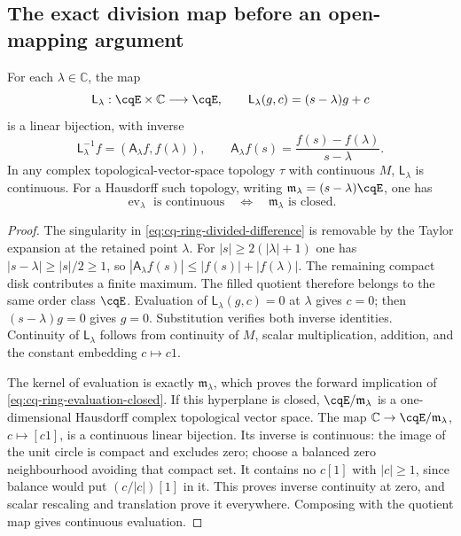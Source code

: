 \subsection{The exact division map before an open-mapping argument}

\begin{cqlemma}
\label{thm:cq-ring-division-map}
For each $\lambda\in\mathbb C$, the map
\begin{equation}
 \mathsf L_\lambda:\cqE\times\mathbb C\longrightarrow\cqE,
 \qquad \mathsf L_\lambda(g,c)=(s-\lambda)g+c
 \label{eq:cq-ring-division-map}
\end{equation}
is a linear bijection, with inverse
\begin{equation}
 \mathsf L_\lambda^{-1}f=(\mathsf A_\lambda f,f(\lambda)),
 \qquad
 \mathsf A_\lambda f(s)=\frac{f(s)-f(\lambda)}{s-\lambda}.
 \label{eq:cq-ring-divided-difference}
\end{equation}
In any complex topological-vector-space topology $\tau$ with
continuous $M$, $\mathsf L_\lambda$ is continuous. For a Hausdorff
such topology, writing
$\mathfrak m_\lambda=(s-\lambda)\cqE$, one has
\begin{equation}
 \operatorname{ev}_\lambda\text{ is continuous}
 \quad\Longleftrightarrow\quad
 \mathfrak m_\lambda\text{ is closed}.
 \label{eq:cq-ring-evaluation-closed}
\end{equation}
\end{cqlemma}
\begin{proof}
The singularity in \eqref{eq:cq-ring-divided-difference} is
removable by the Taylor expansion at the retained point $\lambda$.
For $|s|\geq2(|\lambda|+1)$ one has $|s-\lambda|\geq|s|/2\geq1$,
so
$|\mathsf A_\lambda f(s)|\leq|f(s)|+|f(\lambda)|$.
The remaining compact disk contributes a finite maximum. The
filled quotient therefore belongs to the same order class $\cqE$.
Evaluation of $\mathsf L_\lambda(g,c)=0$ at $\lambda$ gives $c=0$;
then $(s-\lambda)g=0$ gives $g=0$. Substitution verifies both
inverse identities. Continuity of $\mathsf L_\lambda$ follows
from continuity of $M$, scalar multiplication, addition, and
the constant embedding $c\mapsto c1$.

The kernel of evaluation is exactly $\mathfrak m_\lambda$,
which proves the forward implication of
\eqref{eq:cq-ring-evaluation-closed}. If this hyperplane is
closed, $\cqE/\mathfrak m_\lambda$ is a one-dimensional
Hausdorff complex topological vector space. The map
$\mathbb C\to\cqE/\mathfrak m_\lambda$, $c\mapsto[c1]$,
is a continuous linear bijection. Its inverse is continuous:
the image of the unit circle is compact and excludes zero;
choose a balanced zero neighbourhood avoiding that compact
set. It contains no $c[1]$ with $|c|\geq1$, since balance
would put $(c/|c|)[1]$ in it. This proves inverse continuity
at zero, and scalar rescaling and translation prove it everywhere.
Composing with the quotient map gives continuous evaluation.
\end{proof}

